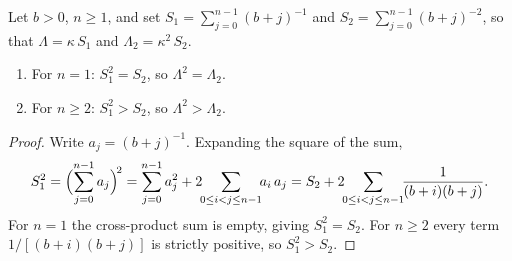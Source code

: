 \begin{lemma}\label{sma:lem-reciprocals}
  Let $b > 0$, $n \ge 1$, and set
  $S_1 = \sum_{j=0}^{n-1}(b+j)^{-1}$ and
  $S_2 = \sum_{j=0}^{n-1}(b+j)^{-2}$, so that
  $\Lambda = \kappa\,S_1$ and $\Lambda_2 = \kappa^2\,S_2$.
  \begin{enumerate}[label=\textup{(\roman*)}]
    \item For $n = 1$: $S_1^2 = S_2$, so $\Lambda^2 = \Lambda_2$.
    \item For $n \ge 2$: $S_1^2 > S_2$, so $\Lambda^2 > \Lambda_2$.
  \end{enumerate}
\end{lemma}

\begin{proof}
  Write $a_j = (b + j)^{-1}$.  Expanding the square of the sum,
  \[
    S_1^2
    = \Bigl(\sum_{j=0}^{n-1} a_j\Bigr)^{\!2}
    = \sum_{j=0}^{n-1} a_j^2
      + 2\!\!\sum_{0 \le i < j \le n-1}\!\! a_i\, a_j
    = S_2
      + 2\!\!\sum_{0 \le i < j \le n-1}\!\!
        \frac{1}{(b+i)(b+j)}.
  \]
  For $n = 1$ the cross-product sum is empty, giving $S_1^2 = S_2$.
  For $n \ge 2$ every term $1/[(b+i)(b+j)]$ is strictly positive, so
  $S_1^2 > S_2$.
\end{proof}

